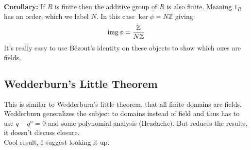 \textbf{Corollary:} If $R$ is finite then the additive group of $R$ is also finite.
Meaning $1_R$ has an order,
which we label $N$.
In this case $\ker\phi = N\mathbb{Z}$ giving:
\[\operatorname{img}\phi = \frac{\mathbb{Z}}{N\mathbb{Z}}\]
It's really easy to use Bézout's identity on these objects to show which ones are fields.

\subsection{Wedderburn's Little Theorem}
This is similar to Wedderburn's little theorem, 
that all finite domains are fields.
Wedderburn generalizes the subject to domains instead of field and thus has to use $q-q^n = 0$ and some polynomial analysis (Headache).
But reduces the results,
it doesn't discuss closure.
\\

Cool result,
I suggest looking it up.
